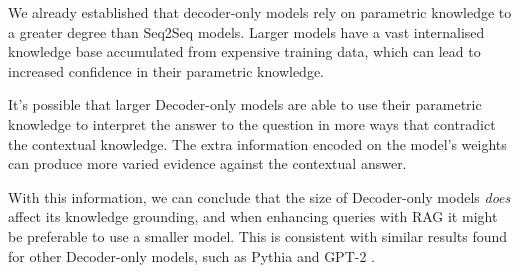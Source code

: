 We already established that decoder-only models rely on parametric knowledge to a greater degree than Seq2Seq models.
Larger models have a vast internalised knowledge base accumulated from expensive training data, which can lead to increased confidence in their parametric knowledge.

It's possible that larger Decoder-only models are able to use their parametric knowledge to interpret the answer to the question in more ways that contradict the contextual knowledge.
The extra information encoded on the model's weights can produce more varied evidence against the contextual answer.

With this information, we can conclude that the size of Decoder-only models \textit{does} affect its knowledge grounding, and when enhancing queries with RAG it might be preferable to use a smaller model.
This is consistent with similar results found for other Decoder-only models, such as Pythia and GPT-2 \cite{factual_recall}.

